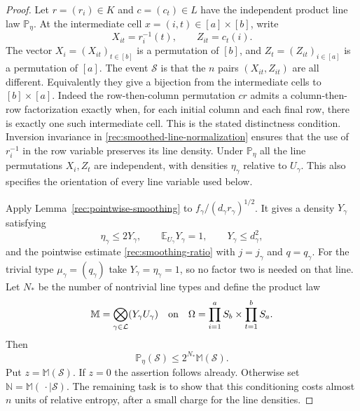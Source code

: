 \begin{proof}
Let $r=(r_i)\in K$ and $c=(c_t)\in L$ have the independent
product line law $\mathbb P_\eta$. At the intermediate cell
$x=(i,t)\in[a]\times[b]$, write
\[
 X_{it}=r_i^{-1}(t),\qquad Z_{it}=c_t(i).
\]
The vector $X_i=(X_{it})_{t\in[b]}$ is a permutation of $[b]$,
and $Z_t=(Z_{it})_{i\in[a]}$ is a permutation of $[a]$.
The event $\mathcal S$ is that the $n$ pairs
$(X_{it},Z_{it})$ are all different. Equivalently they give a
bijection from the intermediate cells to $[b]\times[a]$.
Indeed the row-then-column permutation $cr$ admits a
column-then-row factorization exactly when, for each initial column
and each final row, there is exactly one such intermediate cell.
This is the stated distinctness condition. Inversion invariance in
\eqref{rec:smoothed-line-normalization} ensures that the use of
$r_i^{-1}$ in the row variable preserves its line density.
Under $\mathbb P_\eta$ all the line permutations $X_i,Z_t$
are independent, with densities $\eta_\gamma$ relative to
$U_\gamma$. This also specifies the orientation of every line
variable used below.

Apply Lemma~\ref{rec:pointwise-smoothing} to
$f_\gamma/(d_\gamma r_\gamma)^{1/2}$. It gives a density
$Y_\gamma$ satisfying
\begin{equation}\label{rec:smoothed-line-densities}
 \eta_\gamma\le2Y_\gamma,
 \qquad \mathbb E_{U_\gamma}Y_\gamma=1,
 \qquad Y_\gamma\le d_\gamma^2,
\end{equation}
and the pointwise estimate \eqref{rec:smoothing-ratio} with
$j=j_\gamma$ and $q=q_\gamma$. For the trivial type
$\mu_\gamma=(q_\gamma)$ take $Y_\gamma=\eta_\gamma=1$,
so no factor two is needed on that line. Let $N_*$ be the number
of nontrivial line types and define the product law
\[
 \mathbb M=\bigotimes_{\gamma\in\mathcal L}
                                  (Y_\gamma U_\gamma)
 \quad\hbox{on}\quad
 \Omega=\prod_{i=1}^a S_b\times\prod_{t=1}^b S_a.
\]
Then
\begin{equation}\label{rec:smoothed-majorization-cost}
 \mathbb P_\eta(\mathcal S)\le2^{N_*}\mathbb M(\mathcal S).
\end{equation}
Put $z=\mathbb M(\mathcal S)$. If $z=0$ the assertion follows
already. Otherwise set $\mathbb N=\mathbb M(\,\cdot\mid\mathcal S)$.
The remaining task is to show that this conditioning costs almost
$n$ units of relative entropy, after a small charge for the line
densities.


\end{proof}
